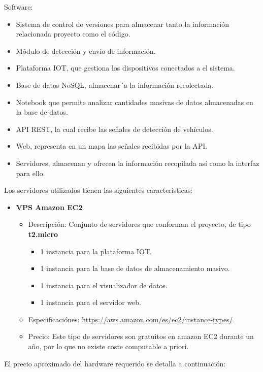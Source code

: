 Software:
\begin{itemize}
	\item Sistema de control de versiones para almacenar tanto la información relacionada proyecto como el código.
	\item Módulo de detección y envío de información.
	\item Plataforma IOT, que gestiona los dispositivos conectados a el sistema.
	\item Base de datos NoSQL, almacenar´a la información recolectada.
	\item Notebook que permite analizar cantidades masivas de datos almacenadas en la base de datos.
	\item API REST, la cual recibe las señales de detección de vehículos.
	\item Web, representa en un mapa las señales recibidas por la API.
	\item Servidores, almacenan y ofrecen la información recopilada así como la interfaz para ello.
\end{itemize}

\newpage

Los servidores utilizados tienen las siguientes características:

\begin{itemize}
 \item \textbf{VPS Amazon EC2}
 \begin{itemize}
  \item Descripción: Conjunto de servidores que conforman el proyecto, de tipo \textbf{t2.micro}
  \begin{itemize}
    \item 1 instancia para la plataforma IOT.
    \item 1 instancia para la base de datos de almacenamiento masivo.
    \item 1 instancia para el visualizador de datos.
    \item 1 instancia para el servidor web.
  \end{itemize}
  \item Especificaciónes: \url{https://aws.amazon.com/es/ec2/instance-types/}
  \item Precio: Este tipo de servidores son gratuitos en amazon EC2 durante un año, por lo que no existe coste computable a priori.
 \end{itemize}
\end{itemize}

\bigskip

El precio aproximado del hardware requerido se detalla a continuación:

